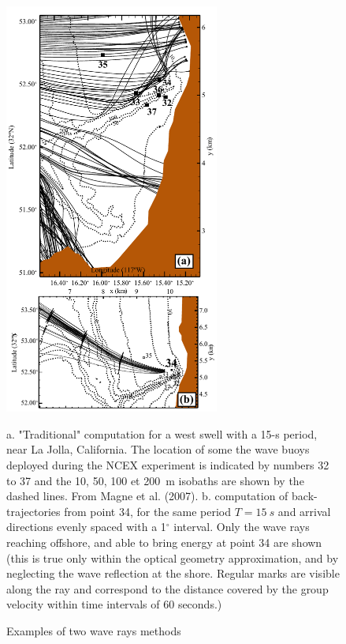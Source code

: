 \begin{figure}
\centerline{\includegraphics[width=0.63\textwidth]{FIGS_CH_SHALLOWLIN/NCEX_rays.png}}
  
    \caption{Examples of two wave rays methods}{a. "Traditional" computation for a west swell with a 15-s period,
    near La Jolla, California. The location of some the wave buoys deployed during the NCEX experiment is indicated
    by numbers 32 to 37 and the  10, 50, 100 et 200~m isobaths are shown by the dashed lines. From Magne et al. 
    (2007\nocite{Magne&al.2007}). b. computation of back-trajectories from point 34, for the same 
    period $T=15~s$ and arrival directions evenly spaced with a 1$^\circ$ interval. Only the wave rays reaching
    offshore, and able to bring energy at point 34 are shown (this is true only within the optical geometry approximation,
    and by neglecting the wave reflection at the shore. Regular marks are visible along the ray and correspond to
    the distance covered by the group velocity within time intervals of 60 seconds.)}
  
   \label{RaysLaJolla}
  \end{figure}


